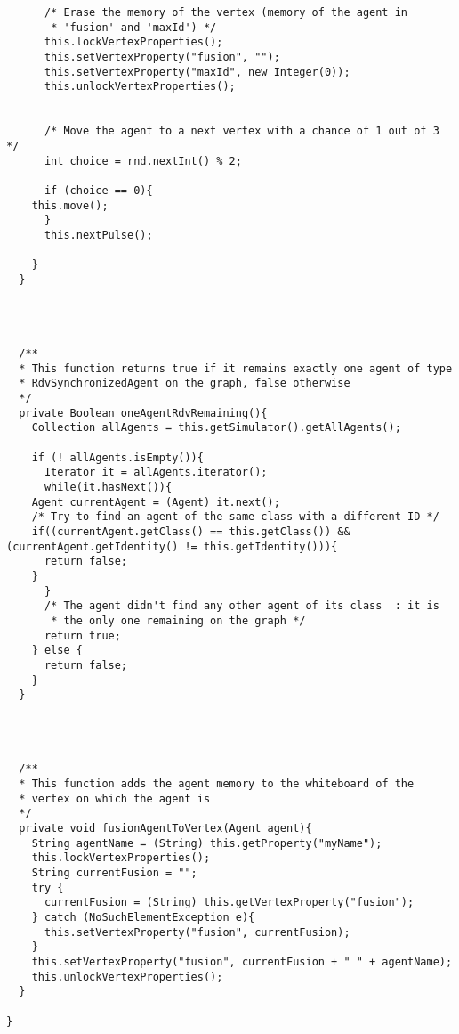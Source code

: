 \begin{verbatim}
      /* Erase the memory of the vertex (memory of the agent in
       * 'fusion' and 'maxId') */
      this.lockVertexProperties();
      this.setVertexProperty("fusion", "");
      this.setVertexProperty("maxId", new Integer(0));
      this.unlockVertexProperties();


      /* Move the agent to a next vertex with a chance of 1 out of 3 */ 
      int choice = rnd.nextInt() % 2;

      if (choice == 0){
	this.move();
      }
      this.nextPulse();

    }
  }




  /**
  * This function returns true if it remains exactly one agent of type
  * RdvSynchronizedAgent on the graph, false otherwise
  */
  private Boolean oneAgentRdvRemaining(){
    Collection allAgents = this.getSimulator().getAllAgents();

    if (! allAgents.isEmpty()){
      Iterator it = allAgents.iterator();
      while(it.hasNext()){
	Agent currentAgent = (Agent) it.next();
	/* Try to find an agent of the same class with a different ID */
	if((currentAgent.getClass() == this.getClass()) && (currentAgent.getIdentity() != this.getIdentity())){
	  return false;
	}
      }
      /* The agent didn't find any other agent of its class  : it is
       * the only one remaining on the graph */
      return true;
    } else {
      return false;
    }
  }




  /**
  * This function adds the agent memory to the whiteboard of the
  * vertex on which the agent is
  */
  private void fusionAgentToVertex(Agent agent){
    String agentName = (String) this.getProperty("myName");
    this.lockVertexProperties();
    String currentFusion = "";
    try {
      currentFusion = (String) this.getVertexProperty("fusion");
    } catch (NoSuchElementException e){
      this.setVertexProperty("fusion", currentFusion);
    }
    this.setVertexProperty("fusion", currentFusion + " " + agentName);
    this.unlockVertexProperties();
  }

}
\end{verbatim}
